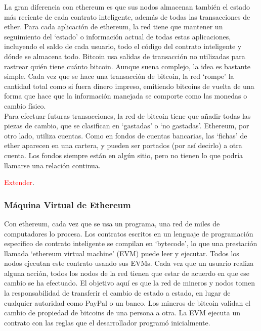 \documentclass[11pt,a4paper]{article}
\begin{document}
La gran diferencia con ethereum es que sus nodos almacenan también el estado más reciente de cada contrato inteligente, además de todas las transacciones de ether.
Para cada aplicación de ethereum, la red tiene que mantener un seguimiento del ‘estado’ o
información actual de todas estas aplicaciones, incluyendo el saldo de cada usuario, todo el código del contrato inteligente y dónde se almacena todo. Bitcoin usa salidas de transacción no utilizadas para rastrear quién tiene cuánto bitcoin.
 Aunque suena complejo, la idea es bastante simple. Cada vez que se hace una transacción de
bitcoin, la red ‘rompe’ la cantidad total como si fuera dinero impreso, emitiendo bitcoins de vuelta de una forma que hace que la información manejada se comporte como las monedas o cambio físico.\\

Para efectuar futuras transacciones, la red de bitcoin tiene que añadir todas las piezas de cambio, que se clasifican en ‘gastadas’ o ‘no gastadas’. Ethereum, por otro lado, utiliza cuentas. Como en fondos de cuentas bancarias, las ‘fichas’ de ether aparecen en una cartera, y pueden ser portados (por así decirlo) a otra cuenta. Los fondos siempre están en algún sitio, pero no tienen lo que podría llamarse una relación continua. 


\textcolor{red}{Extender}. 

\subsubsection{Máquina Virtual de Ethereum}
Con ethereum, cada vez que se usa un programa, una red de miles de computadores lo procesa. Los contratos escritos en un lenguaje de programación específico de contrato inteligente se compilan en ‘bytecode’, lo que una prestación llamada ‘ethereum virtual machine’ (EVM) puede leer y ejecutar. Todos los nodos ejecutan este contrato usando sus EVMs.  Cada vez que un usuario realiza alguna acción, todos los nodos de la red tienen que estar de acuerdo en que ese cambio se ha efectuado.
El objetivo aquí es que la red de mineros y nodos tomen la responsabilidad de transferir el cambio de estado a estado, en lugar de cualquier autoridad como PayPal o un banco. Los mineros de bitcoin validan el cambio de propiedad de bitcoins de una persona a otra. La EVM ejecuta un  contrato con las reglas que el desarrollador programó inicialmente. \\
\end{document}
